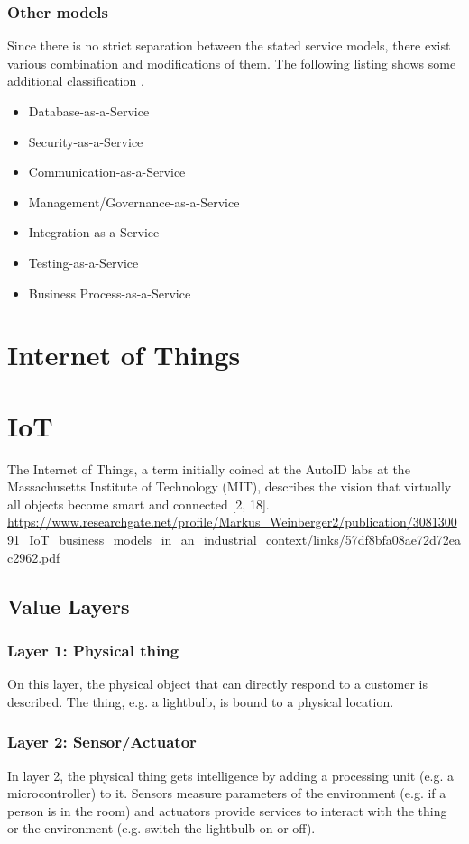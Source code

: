 \subsubsection{Other models}
Since there is no strict separation between the stated service models, there exist various combination and modifications of them. The following listing shows some additional classification \cite{cloud_characteristics}.
\begin{itemize}
	\item Database-as-a-Service
	\item Security-as-a-Service
	\item Communication-as-a-Service
	\item Management/Governance-as-a-Service
	\item Integration-as-a-Service
	\item Testing-as-a-Service
	\item Business Process-as-a-Service
\end{itemize}

\section{Internet of Things}
\section{IoT}

The Internet of Things, a term initially coined at the AutoID labs at the Massachusetts Institute of Technology (MIT), describes the vision that virtually all objects become smart and connected [2, 18].
\url{https://www.researchgate.net/profile/Markus_Weinberger2/publication/308130091_IoT_business_models_in_an_industrial_context/links/57df8bfa08ae72d72eac2962.pdf}
\subsection{Value Layers}

\subsubsection{Layer 1: Physical thing}
On this layer, the physical object that can directly respond to a customer is described. The thing, e.g. a lightbulb, is bound to a physical location.

\subsubsection{Layer 2: Sensor/Actuator}
In layer 2, the physical thing gets intelligence by adding a processing unit (e.g. a microcontroller) to it. Sensors measure parameters of the environment (e.g. if a person is in the room) and actuators provide services to interact with the thing or the environment (e.g. switch the lightbulb on or off).

